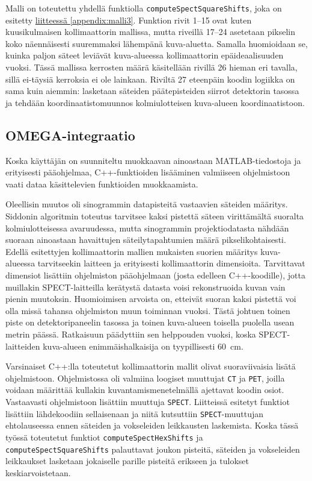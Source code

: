 Malli on toteutettu yhdellä funktiolla \texttt{computeSpectSquareShifts}, joka on esitetty \hyperref[appendix:malli3]{liitteessä \ref*{appendix:malli3}}. Funktion rivit 1--15 ovat kuten kuusikulmaisen kollimaattorin mallissa, mutta riveillä 17--24 asetetaan pikselin koko näennäisesti suuremmaksi lähempänä kuva-aluetta. Samalla huomioidaan se, kuinka paljon säteet leviävät kuva-alueessa kollimaattorin epäideaalisuuden vuoksi. Tässä mallissa kerrosten määrä käsitellään rivillä 26 hieman eri tavalla, sillä ei-täysiä kerroksia ei ole lainkaan. Riviltä 27 eteenpäin koodin logiikka on sama kuin aiemmin: lasketaan säteiden päätepisteiden siirrot detektorin tasossa ja tehdään koordinaatistomuunnos kolmiulotteisen kuva-alueen koordinaatistoon.

\subsection{OMEGA-integraatio}
Koska käyttäjän on suunniteltu muokkaavan ainoastaan MATLAB-tiedostoja ja erityisesti pääohjelmaa, C++-funktioiden lisääminen valmiiseen ohjelmistoon vaati dataa käsittelevien funktioiden muokkaamista.

Oleellisin muutos oli sinogrammin datapisteitä vastaavien säteiden määritys. Siddonin algoritmin toteutus tarvitsee kaksi pistettä säteen virittämältä suoralta kolmiulotteisessa avaruudessa, mutta sinogrammin projektiodatasta nähdään suoraan ainoastaan havaittujen säteilytapahtumien määrä pikselikohtaisesti. Edellä esitettyjen kollimaattorin mallien mukaisten suorien määritys kuva-alueessa tarvitseekin laitteen ja erityisesti kollimaattorin dimensioita. Tarvittavat dimensiot lisättiin ohjelmiston pääohjelmaan (josta edelleen C++-koodille), jotta muillakin SPECT-laitteilla kerätystä datasta voisi rekonstruoida kuvan vain pienin muutoksin. Huomioimisen arvoista on, etteivät suoran kaksi pistettä voi olla missä tahansa ohjelmiston muun toiminnan vuoksi. Tästä johtuen toinen piste on detektoripaneelin tasossa ja toinen kuva-alueen toisella puolella usean metrin päässä. Ratkaisuun päädyttiin sen helppouden vuoksi, koska SPECT-laitteiden kuva-alueen enimmäishalkaisija on tyypillisesti \qty{60}{\centi\meter}\cite{cherry_single_2012}.

Varsinaiset C++:lla toteutetut kollimaattorin mallit olivat suoraviivaisia lisätä ohjelmistoon. Ohjelmistossa oli valmiina loogiset muuttujat \texttt{CT} ja \texttt{PET}, joilla voidaan määrittää kullakin kuvantamismenetelmällä ajettavat koodin osiot. Vastaavasti ohjelmistoon lisättiin muuttuja \texttt{SPECT}. Liitteissä esitetyt funktiot lisättiin lähdekoodiin sellaisenaan ja niitä kutsuttiin \texttt{SPECT}-muuttujan ehtolauseessa ennen säteiden ja vokseleiden leikkausten laskemista. Koska tässä työssä toteutetut funktiot \texttt{computeSpectHexShifts} ja \texttt{computeSpectSquareShifts} palauttavat joukon pisteitä, säteiden ja vokseleiden leikkaukset lasketaan jokaiselle parille pisteitä erikseen ja tulokset keskiarvoistetaan.

